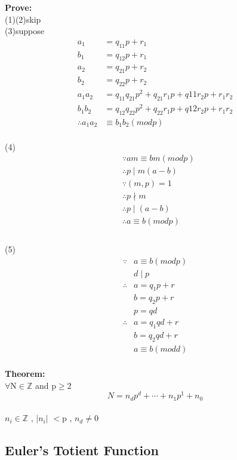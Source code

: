 \documentclass{ctexart}
\begin{document}
\vspace{12 pt}
\textbf{Prove:}
\\(1)(2)skip
\\(3)suppose
\begin{align*} 
a_1&=q_{11}p+r_1\\
b_1&=q_{12}p+r_1\\
a_2&=q_{21}p+r_2\\
b_2&=q_{22}p+r_2\\
a_1a_2&=q_{11}q_{21}p^2+q_{21}r_1p+q{11}r_2p+r_1r_2\\
b_1b_2&=q_{12}q_{22}p^2+q_{22}r_1p+q{12}r_2p+r_1r_2\\
\therefore a_1a_2&\equiv b_1b_2(mod p)
\end{align*}
\\(4)
\begin{align*}
&\because am\equiv bm(mod p)\\
&\therefore p\mid m(a-b)\\
&\because (m,p)=1\\
&\therefore p\nmid m\\
&\therefore p\mid (a-b)\\
&\therefore a\equiv b(mod p)\\
\end{align*}
\\(5)
\begin{align*}
\because &a\equiv b(mod p) \\
 &d\mid p\\
\therefore &a=q_1p+r\\
&b=q_2p+r\\
&p=qd\\
\therefore & a=q_1qd+r\\
& b=q_2qd+r\\
& a\equiv b(mod d)\\
\end{align*}

\vspace{12 pt}
\textbf{Theorem:}
\\ \(\forall\)N\(\in\)\(\mathbb{Z}\) and p\(\ge\)2
\[N=n_dp^d+\cdots+n_1p^1+n_0\]
\\ \(n_i\)\(\in\)\(\mathbb{Z}\) , \(\vert\)\(n_i\)\(\vert\) $<$p , \(n_d\)\(\neq\)0 

\vspace{12 pt}
\subsection{Euler's Totient Function}
\end{document}
